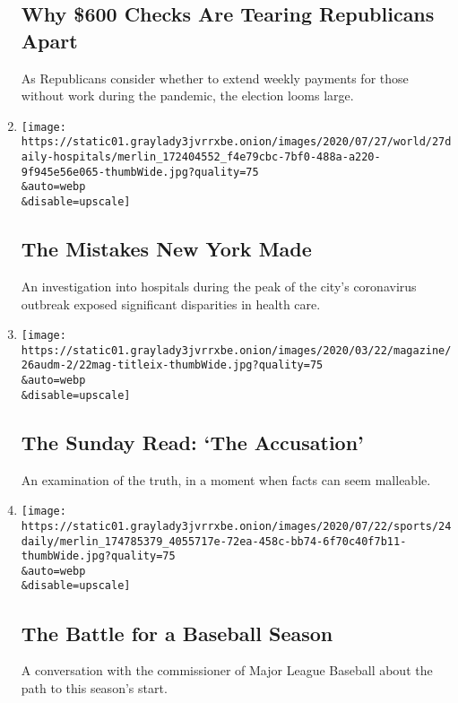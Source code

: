 \begin{enumerate}
  \hypertarget{why-600-checks-are-tearing-republicans-apart}{%
  \subsection{Why \$600 Checks Are Tearing Republicans
  Apart}\label{why-600-checks-are-tearing-republicans-apart}}

  As Republicans consider whether to extend weekly payments for those
  without work during the pandemic, the election looms large.
\item
  \href{/2020/07/27/podcasts/the-daily/new-york-hospitals-covid.html}{}

  \texttt{[image: https://static01.graylady3jvrrxbe.onion/images/2020/07/27/world/27daily-hospitals/merlin\_172404552\_f4e79cbc-7bf0-488a-a220-9f945e56e065-thumbWide.jpg?quality=75\\\&auto=webp\\\&disable=upscale]}

  \hypertarget{the-mistakes-new-york-made}{%
  \subsection{The Mistakes New York
  Made}\label{the-mistakes-new-york-made}}

  An investigation into hospitals during the peak of the city's
  coronavirus outbreak exposed significant disparities in health care.
\item
  \href{/2020/07/26/podcasts/the-daily/the-accusation-the-sunday-read.html}{}

  \texttt{[image: https://static01.graylady3jvrrxbe.onion/images/2020/03/22/magazine/26audm-2/22mag-titleix-thumbWide.jpg?quality=75\\\&auto=webp\\\&disable=upscale]}

  \hypertarget{the-sunday-read-the-accusation}{%
  \subsection{The Sunday Read: `The
  Accusation'}\label{the-sunday-read-the-accusation}}

  An examination of the truth, in a moment when facts can seem
  malleable.
\item
  \href{/2020/07/24/podcasts/the-daily/mlb-baseball-season-coronavirus.html}{}

  \texttt{[image: https://static01.graylady3jvrrxbe.onion/images/2020/07/22/sports/24daily/merlin\_174785379\_4055717e-72ea-458c-bb74-6f70c40f7b11-thumbWide.jpg?quality=75\\\&auto=webp\\\&disable=upscale]}

  \hypertarget{the-battle-for-a-baseball-season}{%
  \subsection{The Battle for a Baseball
  Season}\label{the-battle-for-a-baseball-season}}

  A conversation with the commissioner of Major League Baseball about
  the path to this season's start.
\end{enumerate}

